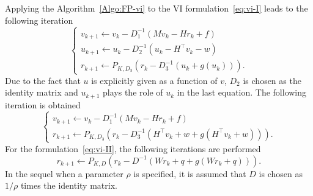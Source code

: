 Applying the Algorithm~\ref{Algo:FP-vi} to the VI formulation~\eqref{eq:vi-I} leads to the following iteration
\begin{equation}
  \label{eq:FP-vi-I}
  \begin{cases}
    v_{k+1} \leftarrow  v_k - D_1^{-1}( M v_{k} - H r_k +f) \\
    u_{k+1} \leftarrow  u_k - D_2^{-1}( u_k - H^\top v_{k} - w) \\ 
    r_{k+1} \leftarrow  P_{K,D_3}(r_k - D_3^{-1}(u_k +  g(u_k))).
  \end{cases}
\end{equation}
Due to the fact that $u$ is explicitly given as a function of $v$, $D_2$ is chosen as the identity matrix and $u_{k+1}$ plays the role of $u_k$ in the last equation. The following iteration is obtained
\begin{equation}
  \label{eq:FP-vi-Ibis}
  \begin{cases}
    v_{k+1} \leftarrow  v_k - D_1^{-1}( M v_{k} - H r_k +f) \\
    r_{k+1} \leftarrow  P_{K,D_3}(r_k - D_3^{-1}(H^\top v_k + w +  g(H^\top v_k+ w ))).
  \end{cases}
\end{equation}
For the formulation~\eqref{eq:vi-II}, the following iterations are performed
\begin{equation}
  \label{eq:FP-vi-II}
       r_{k+1} \leftarrow  P_{K,D}(r_k - D^{-1}( W r_k + q +  g(W r_k + q ))).
\end{equation}
 In the sequel when a parameter $\rho$ is specified, it is assumed that $D$ is chosen as $1/\rho$ times the identity matrix.


